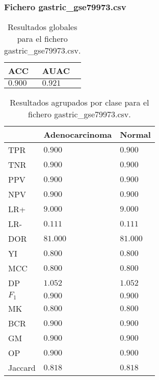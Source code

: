 \bigbreak

\lipsum[1]

\clearpage



\subsubsection{Fichero gastric\_gse79973.csv}

\begin{table}[htp]
    \small
    \centering
    \begin{tabularx}{\columnwidth}{Y Y}
        ACC       & AUAC    \\\hline
        $0.900$   & $0.921$ \\\hline
    \end{tabularx}
    \caption{Resultados globales para el fichero gastric\_gse79973.csv.}
    \label{tab:18}
\end{table}

\begin{table}[htp]
    \small
    \centering
    \begin{tabularx}{\columnwidth}{l Y Y}
                &  Adenocarcinoma       & Normal        \\\hline
        TPR     &  $0.900$              & $0.900$       \\\hline
        TNR     &  $0.900$              & $0.900$       \\\hline
        PPV     &  $0.900$              & $0.900$       \\\hline
        NPV     &  $0.900$              & $0.900$       \\\hline
        LR+     &  $9.000$              & $9.000$       \\\hline
        LR-     &  $0.111$              & $0.111$       \\\hline
        DOR     &  $81.000$             & $81.000$      \\\hline
        YI      &  $0.800$              & $0.800$       \\\hline
        MCC     &  $0.800$              & $0.800$       \\\hline
        DP      &  $1.052$              & $1.052$       \\\hline
        $F_{1}$ &  $0.900$              & $0.900$       \\\hline
        MK      &  $0.800$              & $0.800$       \\\hline
        BCR     &  $0.900$              & $0.900$       \\\hline
        GM      &  $0.900$              & $0.900$       \\\hline
        OP      &  $0.900$              & $0.900$       \\\hline
        Jaccard &  $0.818$              & $0.818$       \\\hline
    \end{tabularx}
    \caption{Resultados agrupados por clase para el fichero gastric\_gse79973.csv.}
    \label{tab:19}
\end{table}

